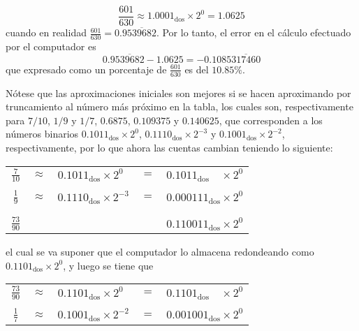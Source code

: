 \begin{solucion}
\begin{enumerate}
  \begin{equation*}
   \frac{601}{630} \approx 1.0001_{\text{dos}} \times 2^{0} = 1.0625
  \end{equation*}
  cuando en realidad $\frac{601}{630} = 0.9\overline{539682}$. Por lo tanto, el error en el c\'alculo efectuado por el computador es
  \begin{equation*}
   0.9\overline{539682} - 1.0625 = -0.1085\overline{317460}
  \end{equation*}
  que expresado como un porcentaje de $\frac{601}{630}$ es del $10.85\%$.
  \par 
  N\'otese que las aproximaciones iniciales son mejores si se hacen aproximando por truncamiento al n\'umero m\'as pr\'oximo en la tabla, los cuales son, respectivamente para $7/10$, $1/9$ y $1/7$, $0.6875$, $0.109375$ y $0.140625$, que corresponden a los n\'umeros binarios $0.1011_{\text{dos}}\times 2^{0}$, $0.1110_{\text{dos}}\times 2^{-3}$ y $0.1001_{\text{dos}} \times 2^{-2}$, respectivamente, por lo que ahora las cuentas cambian teniendo lo siguiente:
  \begin{center}
   \begin{tabular}{ccccc}
    $\frac{7}{10}$ & $\approx$ & $0.1011_{\text{dos}} \times 2^{0}\phantom{1}$ & $=$ & $0.1011_{\text{dos}}\phantom{11} \times 2^{0}$ \\
    \vspace{-0.3cm} 
    \\
    $\frac{1}{9}$ & $\approx$ & $0.1110_{\text{dos}}\times 2^{-3}$ & $=$ & $0.000111_{\text{dos}} \times 2^{0}$ \\ 
    \vspace{-0.4cm}
    \\
    \hhline{-~~~-}
    \vspace{-0.4cm}
    \\
    $\frac{73}{90}$ & & & & $0.110011_{\text{dos}} \times 2^{0}$
   \end{tabular}
  \end{center}
  el cual se va suponer que el computador lo almacena redondeando como $0.1101_{\text{dos}} \times 2^{0}$, y luego se tiene que
  \begin{center}
   \begin{tabular}{ccccc}
    $\frac{73}{90}$ & $\approx$ & $0.1101_{\text{dos}}\times 2^{0}\phantom{1}$ & $=$ & $0.1101_{\text{dos}}\phantom{00} \times 2^{0}$ \\ 
    \vspace{-0.3cm} 
    \\
    $\frac{1}{7}$ & $\approx$ & $0.1001_{\text{dos}} \times 2^{-2}$ & $=$ & $0.001001_{\text{dos}} \times 2^{0}$ \\

\end{tabular}
\end{center}
\end{enumerate}
\end{solucion}
